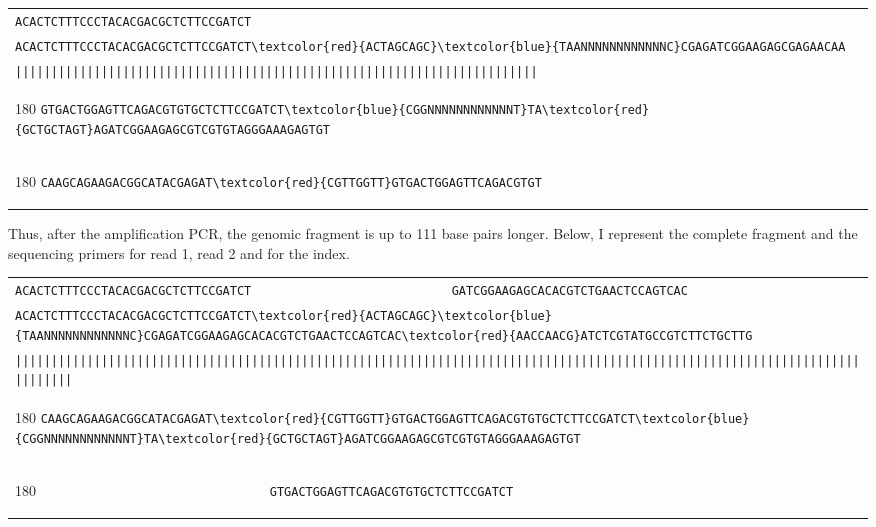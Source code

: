 \documentclass[a4paper,12pt,twosided]{article}
\begin{document}
\begin{flushleft}
\begin{tabular}{l}
   \Verb+ACACTCTTTCCCTACACGACGCTCTTCCGATCT+\\[-6pt]
   \Verb+ACACTCTTTCCCTACACGACGCTCTTCCGATCT\textcolor{red}{ACTAGCAGC}\textcolor{blue}{TAANNNNNNNNNNNNC}CGAGATCGGAAGAGCGAGAACAA+\\[-6pt]
   \Verb+|||||||||||||||||||||||||||||||||||||||||||||||||||||||||||||||||||||||||+\\[-10pt]
   \begin{turn}{180}
      \Verb+GTGACTGGAGTTCAGACGTGTGCTCTTCCGATCT\textcolor{blue}{CGGNNNNNNNNNNNNT}TA\textcolor{red}{GCTGCTAGT}AGATCGGAAGAGCGTCGTGTAGGGAAAGAGTGT+
   \end{turn}
\\[-6pt]
   \begin{turn}{180}
      \Verb+CAAGCAGAAGACGGCATACGAGAT\textcolor{red}{CGTTGGTT}GTGACTGGAGTTCAGACGTGT                                                                         +
   \end{turn}
\\
\end{tabular}
\end{flushleft}
Thus, after the amplification PCR, the genomic fragment is up to 111 base pairs longer. Below, I represent the complete fragment and the sequencing primers for read 1, read 2 and for the index.
\begin{flushleft}
\begin{tabular}{l}
   \Verb+ACACTCTTTCCCTACACGACGCTCTTCCGATCT                            GATCGGAAGAGCACACGTCTGAACTCCAGTCAC+\\[-6pt]
   \Verb+ACACTCTTTCCCTACACGACGCTCTTCCGATCT\textcolor{red}{ACTAGCAGC}\textcolor{blue}{TAANNNNNNNNNNNNC}CGAGATCGGAAGAGCACACGTCTGAACTCCAGTCAC\textcolor{red}{AACCAACG}ATCTCGTATGCCGTCTTCTGCTTG+\\[-6pt]
   \Verb+||||||||||||||||||||||||||||||||||||||||||||||||||||||||||||||||||||||||||||||||||||||||||||||||||||||||||||||||||||||||||||||+\\[-10pt]
   \begin{turn}{180}
      \Verb+CAAGCAGAAGACGGCATACGAGAT\textcolor{red}{CGTTGGTT}GTGACTGGAGTTCAGACGTGTGCTCTTCCGATCT\textcolor{blue}{CGGNNNNNNNNNNNNT}TA\textcolor{red}{GCTGCTAGT}AGATCGGAAGAGCGTCGTGTAGGGAAAGAGTGT+
   \end{turn}
\\[-6pt]
   \begin{turn}{180}
      \Verb+                                GTGACTGGAGTTCAGACGTGTGCTCTTCCGATCT                                                            +
   \end{turn}
\\
\end{tabular}
\end{flushleft}
\end{document}
